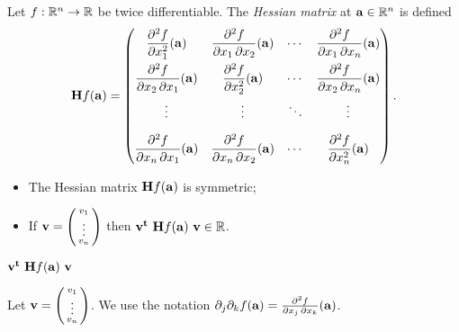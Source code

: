 \begin{definition}
    Let \(f:\bR^n \to\bR\) be twice differentiable.
    The \emph{Hessian matrix} at \(\aa\in \bR^n\) is defined
    \[
        \mathbf{H} f (\aa)= \begin{pmatrix}
            \dfrac{\partial^2 f}{\partial x_1^2} (\aa)
             & \dfrac{\partial^2 f}{\partial x_1\,\partial x_2} (\aa)
             & \cdots
             & \dfrac{\partial^2 f}{\partial x_1\,\partial x_n}(\aa)  \\[2.2ex]
            \dfrac{\partial^2 f}{\partial x_2\,\partial x_1} (\aa)
             & \dfrac{\partial^2 f}{\partial x_2^2}(\aa)
             & \cdots
             & \dfrac{\partial^2 f}{\partial x_2\,\partial x_n}(\aa)  \\[2.2ex]
            \vdots
             & \vdots
             & \ddots
             & \vdots                                                 \\[2.2ex]
            \dfrac{\partial^2 f}{\partial x_n\,\partial x_1} (\aa)
             & \dfrac{\partial^2 f}{\partial x_n\,\partial x_2} (\aa)
             & \cdots
             & \dfrac{\partial^2 f}{\partial x_n^2}(\aa)
        \end{pmatrix}.
    \]
\end{definition}



\begin{itemize}
    \item The Hessian matrix \(\mathbf{H} f (\aa)\) is symmetric;
\end{itemize}

\begin{itemize}
    \item If \(\vv= \left( \begin{smallmatrix}
                  v_1\\ \vdots \\v_n
              \end{smallmatrix} \right)  \) then \(\vv^{\mathbf{t}} \ \mathbf{H} f (\aa) \ \vv \in \bR\).
\end{itemize}







\textbf{\(\vv^{\mathbf{t}} \ \mathbf{H} f (\aa) \ \vv\)}

Let \(\vv= \left( \begin{smallmatrix}
        v_1\\ \vdots \\v_n
    \end{smallmatrix} \right)  \).
We use the notation
\(\partial_{j}\partial_{k}f(\aa) = \frac{\partial^2 f}{\partial x_j\,\partial x_k} (\aa)\).

